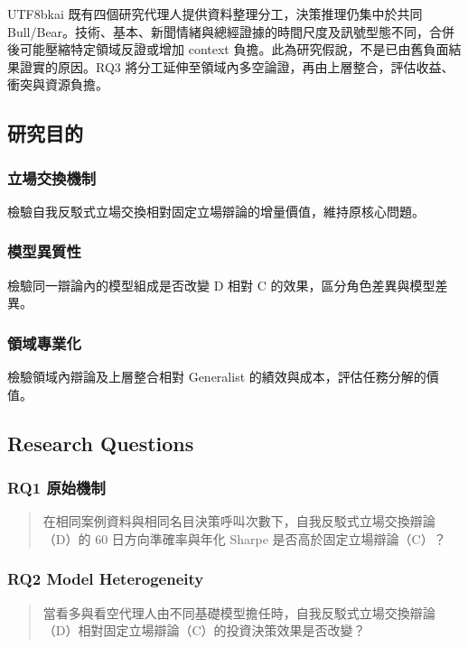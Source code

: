 \documentclass[12pt,a4paper]{article}
\begin{document}
\begin{CJK}{UTF8}{bkai}
既有四個研究代理人提供資料整理分工，決策推理仍集中於共同 Bull/Bear。技術、基本、新聞情緒與總經證據的時間尺度及訊號型態不同，合併後可能壓縮特定領域反證或增加 context 負擔。此為研究假說，不是已由舊負面結果證實的原因。RQ3 將分工延伸至領域內多空論證，再由上層整合，評估收益、衝突與資源負擔。

\subsection{研究目的}

\subsubsection{立場交換機制}
檢驗自我反駁式立場交換相對固定立場辯論的增量價值，維持原核心問題。

\subsubsection{模型異質性}
檢驗同一辯論內的模型組成是否改變 D 相對 C 的效果，區分角色差異與模型差異。

\subsubsection{領域專業化}
檢驗領域內辯論及上層整合相對 Generalist 的績效與成本，評估任務分解的價值。

\subsection{Research Questions}

\subsubsection{RQ1 原始機制}
\begin{quote}在相同案例資料與相同名目決策呼叫次數下，自我反駁式立場交換辯論（D）的 60 日方向準確率與年化 Sharpe 是否高於固定立場辯論（C）？\end{quote}

\subsubsection{RQ2 Model Heterogeneity}
\begin{quote}當看多與看空代理人由不同基礎模型擔任時，自我反駁式立場交換辯論（D）相對固定立場辯論（C）的投資決策效果是否改變？\end{quote}


\end{CJK}
\end{document}
